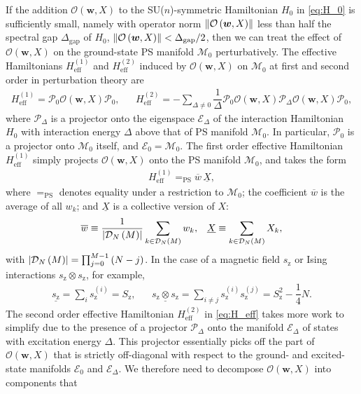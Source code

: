 \documentclass[nofootinbib,notitlepage,11pt]{revtex4-2}
\renewcommand{\t}{\text} %
\newcommand{\f}[2]{\dfrac{#1}{#2}} %
\newcommand{\p}[1]{\left(#1\right)} %
\newcommand{\m}{\bm} %
\newcommand{\1}{\mathds{1}}
\newcommand{\z}{\text{z}}
\newcommand{\D}{\mathcal{D}}
\newcommand{\E}{\mathcal{E}}
\newcommand{\M}{\mathcal{M}}
\renewcommand{\O}{\mathcal{O}}
\renewcommand{\P}{\mathcal{P}}
\newcommand{\EQPS}{=_{\text{PS}}}
\newcommand{\col}{\underline}
\newcommand{\mean}{\overline}
\begin{document}
If the addition $\O\p{\m w,X}$ to the SU($n$)-symmetric Hamiltonian
$H_0$ in \eqref{eq:H_0} is sufficiently small, namely with operator
norm $\norm{\O\p{\m w,X}}$ less than half the spectral gap
$\Delta_{\t{gap}}$ of $H_0$, $\norm{\O\p{\m w,X}}<\Delta_{\t{gap}}/2$,
then we can treat the effect of $\O\p{\m w,X}$ on the ground-state PS
manifold $\M_0$ perturbatively.  The effective Hamiltonians
$H_{\t{eff}}^{(1)}$ and $H_{\t{eff}}^{(2)}$ induced by $\O\p{\m w,X}$
on $\M_0$ at first and second order in perturbation theory
are\cite{bravyi2011schrieffer}
\begin{align}
  H_{\t{eff}}^{(1)} = \P_0 \O\p{\m w,X} \P_0,
  &&
  H_{\t{eff}}^{(2)} = - \sum_{\Delta\ne0}
  \f1\Delta \P_0 \O\p{\m w,X} \P_\Delta \O\p{\m w,X} \P_0,
  \label{eq:H_eff}
\end{align}
where $\P_\Delta$ is a projector onto the eigenspace $\E_\Delta$ of
the interaction Hamiltonian $H_0$ with interaction energy $\Delta$
above that of PS manifold $\M_0$.  In particular, $\P_0$ is a
projector onto $\M_0$ itself, and $\E_0=\M_0$.  The first order
effective Hamiltonian $H_{\t{eff}}^{(1)}$ simply projects
$\O\p{\m w,X}$ onto the PS manifold $\M_0$, and takes the form
\begin{align}
  H_{\t{eff}}^{(1)} \EQPS \mean w \, \col X,
  \label{eq:H_eff_1}
\end{align}
where $\EQPS$ denotes equality under a restriction to $\M_0$; the
coefficient $\mean w$ is the average of all $w_k$; and $\col X$ is a
collective version of $X$:
\begin{align}
  \mean w \equiv \f1{\abs{\D_N\p{M}}}
  \sum_{k\in\D_N\p{M}} w_k,
  &&
  \col X \equiv \sum_{k\in\D_N\p{M}} X_k,
  \label{eq:mean_col}
\end{align}
with $\abs{\D_N\p{M}}=\prod_{j=0}^{M-1}\p{N-j}$.  In the case of a
magnetic field $s_\z$ or Ising interactions $s_\z\otimes s_\z$, for
example,
\begin{align}
  \col{s_\z} = \sum_i s_\z^{(i)} = S_\z,
  &&
  \col{s_\z\otimes s_\z}
  = \sum_{i\ne j} s_\z^{(i)} s_\z^{(j)}
  = S_\z^2 - \f14 N.
\end{align}
The second order effective Hamiltonian $H_{\t{eff}}^{(2)}$ in
\eqref{eq:H_eff} takes more work to simplify due to the presence of a
projector $\P_\Delta$ onto the manifold $\E_\Delta$ of states with
excitation energy $\Delta$.  This projector essentially picks off the
part of $\O\p{\m w,X}$ that is strictly off-diagonal with respect to
the ground- and excited-state manifolds $\E_0$ and $\E_\Delta$.  We
therefore need to decompose $\O\p{\m w,X}$ into components that
\end{document}
